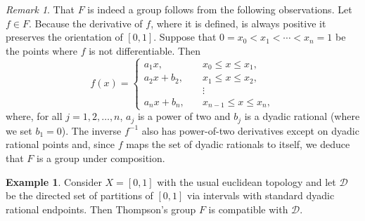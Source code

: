 \documentclass[11pt,oneside]{amsart}
\theoremstyle{plain}%
\theoremstyle{definition}
\newtheorem{example}{Example}[section]
\theoremstyle{remark}
\newtheorem*{remark}{Remark}
\begin{document}
\begin{remark}
	That $F$ is indeed a group follows from the following observations. Let $f\in F$. Because the derivative of $f$, where it is defined, is always positive it preserves the orientation of $[0,1]$. Suppose that $0 = x_0 < x_1 < \cdots < x_n = 1$ be the points where $f$ is not differentiable. Then
	\begin{equation}
		f(x) = \begin{cases}
			a_1x, \quad & x_0\le x \le x_1, \\
			a_2x+ b_2, \quad & x_1\le x \le x_2, \\
			&\vdots  \\
			a_nx+ b_n, \quad & x_{n-1}\le x \le x_n,
		\end{cases}
	\end{equation}
	where, for all $j=1, 2, \ldots, n$, $a_j$ is a power of two and $b_j$ is a dyadic rational (where we set $b_1 = 0$). The inverse $f^{-1}$ also has power-of-two derivatives except on dyadic rational points and, since $f$ maps the set of dyadic rationals to itself, we deduce that $F$ is a group under composition.
\end{remark}

\begin{example}
	Consider $X = [0,1]$ with the usual euclidean topology and let $\mathcal{D}$ be the directed set of partitions of $[0,1]$ via intervals with standard dyadic rational endpoints. Then Thompson's group $F$ is compatible with $\mathcal{D}$.
\end{example}
\end{document}
